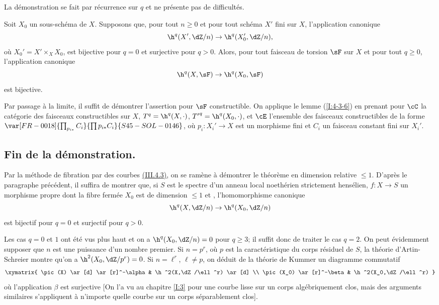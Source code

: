 La démonstration se fait par récurrence sur $q$ et ne présente pas de 
difficultés. 





\begin{propositiondotdash}\label{I:4-3-7}
Soit $X_0$ un sous-schéma de $X$. Supposons que, pour tout $n\geqslant 0$ et 
pour tout schéma $X'$ fini sur $X$, l'application canonique 
\[
  \h^q(X',\dZ/n) \to \h^q(X_0',\dZ/n)\text{,}
\]
où $X_0' = X'\times_X X_0$, est bijective pour $q=0$ et surjective pour 
$q>0$. Alors, pour tout faisceau de torsion $\sF$ sur $X$ et pour tout 
$q\geqslant 0$, l'application canonique 
\[
  \h^q(X,\sF) \to \h^q(X_0,\sF)
\]
est bijective.
\end{propositiondotdash}

Par passage à la limite, il suffit de démontrer l'assertion pour $\sF$ 
constructible. On applique le lemme (\ref{I:4-3-6}) en prenant pour $\cC$ la 
catégorie des faisceaux constructibles sur $X$, $T^q=\h^q(X,\cdot)$, 
${T'}^q=\h^q(X_0,\cdot)$, et $\cE$ l'ensemble des faisceaux constructibles de la 
forme $\var[FR-0018]{\prod_{p_{i*}} C_i}{\prod p_{i*} C_i}{S45-SOL-0146}$, où $p_i:X_i'\to X$ est un morphisme fini et $C_i$ 
un faisceau constant fini sur $X_i'$. 










\subsection{Fin de la démonstration.}\label{I:4-4}

Par la méthode de fibration par des courbes \hyperref[I:3-4-3]{(III.4.3)}, on se ramène 
à démontrer le théorème en dimension relative $\leqslant 1$. D'après 
le paragraphe précédent, il suffira de montrer que, si $S$ est le spectre 
d'un anneau local noethérien strictement hensélien, $f:X\to S$ un 
morphisme propre dont la fibre fermée $X_0$ est de dimension $\leqslant 1$ 
et , l'homomorphisme canonique 
\[
  \h^q(X,\dZ/n) \to \h^q(X_0,\dZ/n)
\]
est bijectif pour $q=0$ et surjectif pour $q>0$. 

Les cas $q=0$ et $1$ ont été vus plus haut et on a $\h^q(X_0,\dZ/n) = 0$ 
pour $q\geqslant 3$; il suffit donc de traiter le cas $q=2$. On peut 
évidemment supposer que $n$ est une puissance d'un nombre premier. Si 
$n=p^r$, où $p$ est la caractéristique du corps résiduel de $S$, la 
théorie d'Artin-Schreier montre qu'on a $\h^2(X_0,\dZ/p^r) = 0$. Si 
$n=\ell^r$, $\ell\ne p$, on déduit de la théorie de Kummer un diagramme 
commutatif 
\[\xymatrix{
  \pic(X) \ar[d] \ar[r]^-\alpha 
    & \h^2(X,\dZ/\ell^r) \ar[d] \\
  \pic(X_0) \ar[r]^-\beta 
    & \h^2(X_0,\dZ/\ell^r)
}\]
où l'application $\beta$ est surjective [On l'a vu au chapitre \ref{I:3} pour 
une courbe lisse sur un corps algébriquement clos, mais des arguments 
similaires s'appliquent à n'importe quelle courbe sur un corps 
séparablement clos]. 

